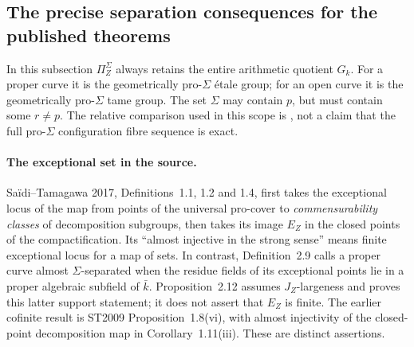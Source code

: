 \subsection{The precise separation consequences for the published theorems}

In this subsection $\Pi_Z^\Sigma$ always retains the entire arithmetic
quotient $G_k$. For a proper curve it is the geometrically pro-$\Sigma$
\'etale group; for an open curve it is the geometrically pro-$\Sigma$
tame group. The set $\Sigma$ may contain $p$, but must contain some
$r\ne p$. The relative comparison used in this scope is
, not a claim that the full pro-$\Sigma$
configuration fibre sequence is exact.

\paragraph{The exceptional set in the source.}
Sa\"idi--Tamagawa 2017, Definitions~1.1, 1.2 and 1.4, first takes
the exceptional locus of the map from points of the universal
pro-cover to \emph{commensurability classes} of decomposition
subgroups, then takes its image $E_Z$ in the closed points of the
compactification. Its ``almost injective in the strong sense'' means
finite exceptional locus for a map of sets. In contrast,
Definition~2.9 calls a proper curve almost $\Sigma$-separated when
the residue fields of its exceptional points lie in a proper
algebraic subfield of $\bar k$. Proposition~2.12 assumes
$J_Z$-largeness and proves this latter support statement; it does
not assert that $E_Z$ is finite. The earlier cofinite result is
ST2009 Proposition~1.8(vi), with almost injectivity of the
closed-point decomposition map in Corollary~1.11(iii).
These are distinct assertions.\citep[Definitions~1.1, 1.2, 1.4,
2.6, 2.9; Proposition~2.12]{LA_ST2017}
\citep[Proposition~1.8(vi), Corollary~1.11]{LA_ST2009}

